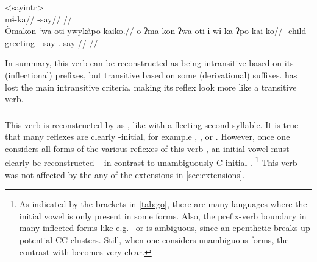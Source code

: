 \pex<sayintr>
 \akuriyo \parencite[][113]{meira1998proto}\\
\begingl
\gla mɨ-ka//
\glb {}-say//
\glft {}//
\endgl
{} \kalina \parencite[][202]{courtz2008carib}\\
\begingl
\glpreamble Òmakon `wa oti ywykàpo kaiko.//
\gla o-ʔma-kon ʔwa oti ɨ-wɨ-ka-ʔpo kai-ko//
\glb {}-child-  greeting --say-. say-//
\glft {}//
\endgl
\xe

In summary, this verb can be reconstructed as being intransitive based on its (inflectional) prefixes, but transitive based on some (derivational) suffixes.
\hixka has lost the main intransitive criteria, making its reflex look more like a transitive verb.

\subsubsection{ }
\label{sec:go}
This verb is reconstructed by \textcite{gildea2007greenberg} as , like   with a fleeting second syllable.
It is true that many reflexes are clearly -initial, for example \hixka {}  \parencite[27]{hixkaryanaderby1985}, \trio {}  \parencite[246]{triomeira1999}, or \wayana {}  \parencite[195]{wayanatavares2005}.
However, once one considers all forms of the various reflexes of this verb , an initial vowel  must clearly be reconstructed -- in contrast to unambiguously C-initial  .%
\footnote{As indicated by the brackets in \cref{tab:go}, there are many languages where the initial vowel is only present in some forms.
Also, the prefix-verb boundary in many inflected forms like e.g.\ \trio {} or \arara {}  \parencites[43]{triomeira1999}[153]{alves2017arara} is ambiguous, since an epenthetic  breaks up potential CC clusters.
Still, when one considers unambiguous forms, the contrast with  becomes very clear.}
This verb was not affected by the any of the extensions in \cref{sec:extensions}.


